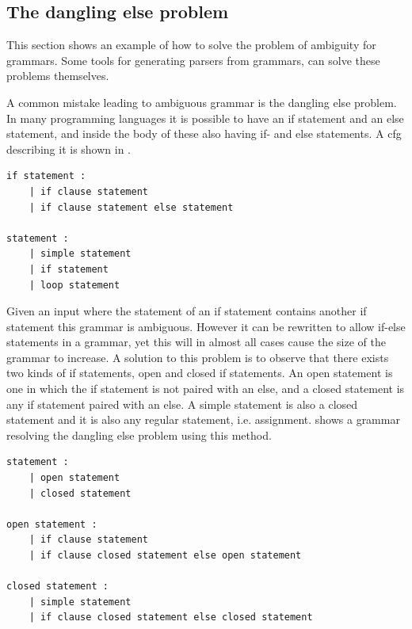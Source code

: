 \subsection{The dangling else problem} 
This section shows an example of how to solve the problem of ambiguity for grammars. 
Some tools for generating parsers from grammars, can solve these problems themselves.

A common mistake leading to ambiguous grammar is the dangling else problem. \citep{danglingelse}
In many programming languages it is possible to have an if statement and an else statement, and inside the body of these also having if- and else statements. 
A \acrshort{cfg} describing it is shown in .

\begin{lstlisting}[caption={An example of a \acrshort{cfg} describing an if statement. \citep{danglingelse}},frame=tlrb,label={lst:danglingelseex1},numbers=none]
if statement :
    | if clause statement
    | if clause statement else statement

statement :
    | simple statement
    | if statement
    | loop statement
\end{lstlisting}

Given an input where the statement of an if statement contains another if statement this grammar is ambiguous.  
However it can be rewritten to allow if-else statements in a grammar, yet this will in almost all cases cause the size of the grammar to increase. 
A solution to this problem is to observe that there exists two kinds of if statements, open and closed if statements.
An open statement is one in which the if statement is not paired with an else, and a closed statement is any if statement paired with an else.
A simple statement is also a closed statement and it is also any regular statement, i.e. assignment.
 shows a grammar resolving the dangling else problem using this method.


\begin{lstlisting}[caption={An example of a \acrshort{cfg} describing an if statement, that is not ambiguous. \citep{danglingelse}},frame=tlrb,label={lst:danglingelseex2},numbers=none]
statement :
    | open statement
    | closed statement

open statement :
    | if clause statement
    | if clause closed statement else open statement

closed statement :
    | simple statement
    | if clause closed statement else closed statement
\end{lstlisting}

